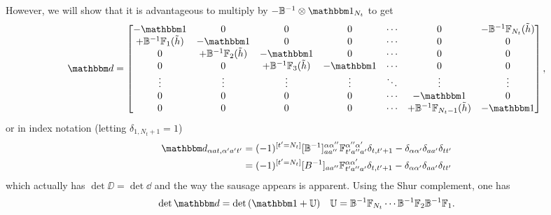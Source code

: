 However, we will show that it is advantageous to multiply by $-\BB\inverse \otimes \one_{N_t}$ to get
\begin{align}
    \dd
	=
	\begin{bmatrix}
			-\one                           & 0                                 & 0                                 & 0         & \cdots & 0                                    & -\BB\inverse\FF_{N_t}(\tilde{h})
		\\	+\BB\inverse\FF_{1}(\tilde{h})  & -\one                             & 0                                 & 0         & \cdots & 0                                    & 0
		\\	0                               & +\BB\inverse\FF_{2}(\tilde{h})    & -\one                             & 0         & \cdots & 0                                    & 0
		\\	0                               & 0                                 & +\BB\inverse\FF_{3}(\tilde{h})    & -\one     & \cdots & 0                                    & 0
		\\	\vdots                          & \vdots                            & \vdots                            & \vdots    & \ddots & \vdots                               & \vdots
		\\	0                               & 0                                 & 0                                 & 0         & \cdots & -\one                                & 0
		\\	0                               & 0                                 & 0                                 & 0         & \cdots & +\BB\inverse\FF_{N_t-1}(\tilde{h})   & -\one
	\end{bmatrix},
	\label{eq:fermion matrix}
\end{align}
or in index notation (letting $\delta_{1,N_t+1}=1$)
\begin{align}
	\dd_{\alpha a t, \alpha' a' t'} &= (-1)^{[t'=N_t]} [\BB\inverse]^{\alpha\alpha''}_{aa''}\FF_{t' a''a'}^{\alpha''\alpha'} \delta_{t,t'+1} - \delta_{\alpha\alpha'} \delta_{aa'} \delta_{tt'}
	\\
	&= (-1)^{[t'=N_t]} [B\inverse]_{aa''}\FF_{t' a''a'}^{\alpha\alpha'} \delta_{t,t'+1} - \delta_{\alpha\alpha'} \delta_{aa'} \delta_{tt'}
\end{align}
which actually has $\det \DD = \det \dd$ and the way the sausage appears is apparent.
Using the Shur complement, one has
\begin{align}
	\det \dd &= \det\left( \one + \UU \right)
	&
	\UU = \BB\inverse \FF_{N_t} \cdots \BB\inverse \FF_{2} \BB\inverse \FF_1.
	\label{eq:sausage}
\end{align}
